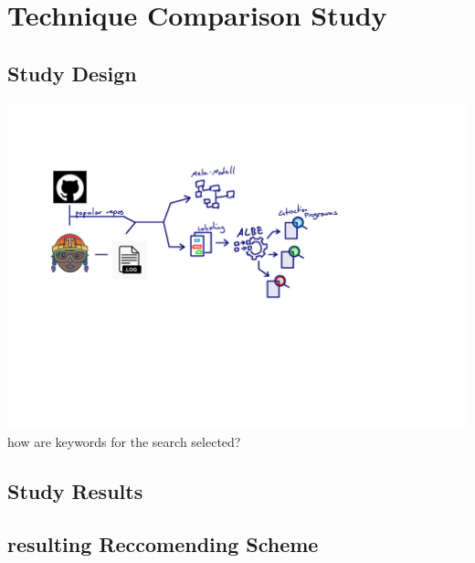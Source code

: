 \documentclass[\myrootdir/main.tex]{subfiles}
\begin{document}
\chapter{Technique Comparison Study}
\label{evaluation}

\section{Study Design}
\includegraphics[page=6, width=\textwidth, trim={0.5cm 0.5cm 0.5cm 0.5cm}, clip]{img/flow-of-research.pdf}
how are keywords for the search selected?

\section{Study Results}

\section{resulting Reccomending Scheme}
\end{document}

